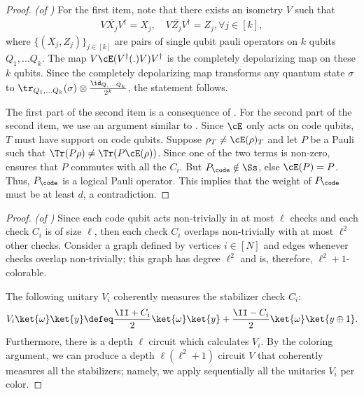 \documentclass{toc}
\begin{document}
\begin{proof}\textit{(of )}
For the first item, note that there exists an isometry $V$ such that
\begin{align}
V\overline{X_j} V^{\dagger} = X_j, \quad V\overline{Z_j} V^{\dagger} = Z_j, \forall j\in [k],
\end{align}
where $\{(X_j,Z_j)\}_{j\in [k]}$ are pairs of single qubit pauli operators on $k$ qubits $Q_1,\ldots Q_k$. The map 
$V\cE(V^{\dagger}(.)V)V^{\dagger}$ is the completely depolarizing map on these $k$ qubits. Since the completely depolarizing map transforms any quantum state $\sigma$ to $\tr_{Q_1,\ldots Q_k}(\sigma)\otimes \frac{\id_{Q_,\ldots Q_k}}{2^k}$, the statement follows.

The first part of the second item is a consequence of . For the second part of the second item, we use an argument similar to . Since $\cE$ only acts on code qubits, $T$ must have support on code qubits. Suppose $\rho_T\neq \cE(\rho)_T$ and let $P$ be a Pauli such that $\Tr(P\rho)\neq \Tr(P\cE(\rho))$. Since one of the two terms is non-zero,  ensures that $P$ commutes with all the $C_i$. But $P_{\code}\notin \Ss$, else $\cE(P)=P$. Thus, $P_{\code}$ is a logical Pauli operator. This implies that the weight of $P_{\code}$ must be at least $d$, a contradiction. 
\end{proof}

\begin{proof}\textit{(of )}
Since each code qubit acts non-trivially in at most $\ell$ checks and each check $C_i$ is of size $\ell$, then each check $C_i$ overlaps non-trivially with at most $\ell^2$ other checks. Consider a graph defined by vertices $i \in [N]$ and edges whenever checks overlap non-trivially; this graph has degree $\ell^2$ and is, therefore, $\ell^2 + 1$-colorable. 

The following unitary $V_i$ coherently measures the stabilizer check $C_i$:
\begin{align}
    V_i \ket{\omega} \ket{y} \defeq \frac{\II + C_i}{2} \ket{\omega}\ket{y} + \frac{\II - C_i}{2} \ket{\omega}\ket{y \oplus 1}.
\end{align}
Furthermore, there is a depth $\ell$ circuit which calculates $V_i$. By the coloring argument, we can produce a depth $\ell(\ell^2 + 1)$ circuit $V$ that coherently measures all the stabilizers; namely, we apply sequentially all the unitaries $V_i$ per color.
\end{proof}
\end{document}
